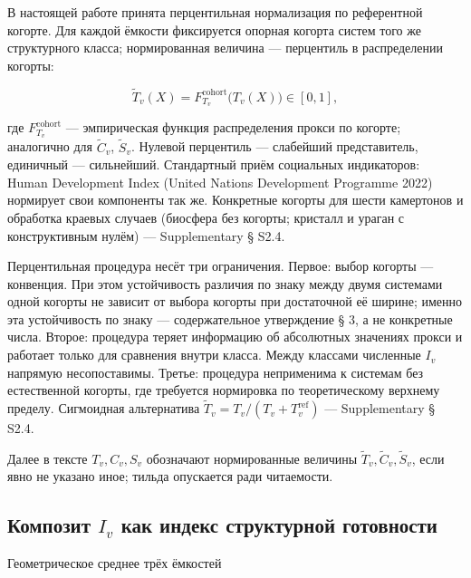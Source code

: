 \documentclass[pdflatex,sn-mathphys-ay]{sn-jnl}
\begin{document}
В настоящей работе принята перцентильная нормализация по референтной когорте. Для каждой ёмкости фиксируется опорная когорта систем того же структурного класса; нормированная величина --- перцентиль в распределении когорты:

\begin{equation}\tilde{T}_v(X) = F_{T_v}^{\text{cohort}}\bigl(T_v(X)\bigr) \in [0, 1], \tag{2a}\end{equation}

где \(F_{T_v}^{\text{cohort}}\) --- эмпирическая функция распределения прокси по когорте; аналогично для \(\tilde{C}_v\), \(\tilde{S}_v\). Нулевой перцентиль --- слабейший представитель, единичный --- сильнейший. Стандартный приём социальных индикаторов: Human Development Index (United Nations Development Programme 2022) нормирует свои компоненты так же. Конкретные когорты для шести камертонов и обработка краевых случаев (биосфера без когорты; кристалл и ураган с конструктивным нулём) --- Supplementary § S2.4.

Перцентильная процедура несёт три ограничения. Первое: выбор когорты --- конвенция. При этом устойчивость различия по знаку между двумя системами одной когорты не зависит от выбора когорты при достаточной её ширине; именно эта устойчивость по знаку --- содержательное утверждение § 3, а не конкретные числа. Второе: процедура теряет информацию об абсолютных значениях прокси и работает только для сравнения внутри класса. Между классами численные \(I_v\) напрямую несопоставимы. Третье: процедура неприменима к системам без естественной когорты, где требуется нормировка по теоретическому верхнему пределу. Сигмоидная альтернатива \(\tilde{T}_v = T_v/(T_v + T_v^{\text{ref}})\) --- Supplementary § S2.4.

Далее в тексте \(T_v, C_v, S_v\) обозначают нормированные величины \(\tilde T_v, \tilde C_v, \tilde S_v\), если явно не указано иное; тильда опускается ради читаемости.

\subsection{\texorpdfstring{Композит \(I_v\) как индекс структурной готовности}{Композит I\_v как индекс структурной готовности}}\label{ux43aux43eux43cux43fux43eux437ux438ux442-i_v-ux43aux430ux43a-ux438ux43dux434ux435ux43aux441-ux441ux442ux440ux443ux43aux442ux443ux440ux43dux43eux439-ux433ux43eux442ux43eux432ux43dux43eux441ux442ux438}

Геометрическое среднее трёх ёмкостей
\end{document}
